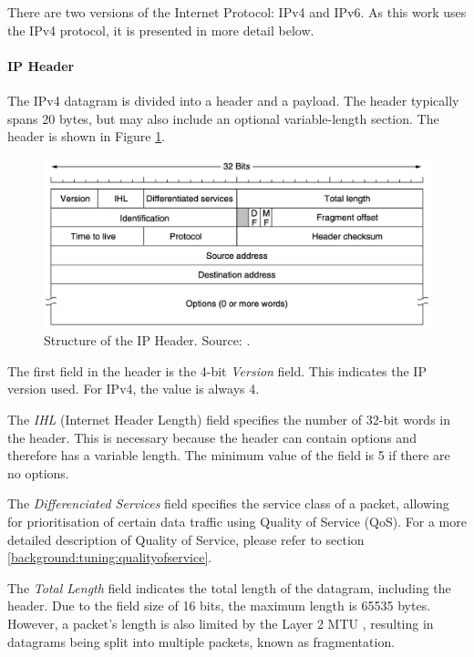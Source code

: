 There are two versions of the Internet Protocol: IPv4 and IPv6. As this work uses the IPv4 protocol, it is presented in more detail below.

\paragraph{IP Header} \label{chap:ipheader}

The IPv4 datagram is divided into a header and a payload. The header typically spans 20 bytes, but may also include an optional variable-length section. The header is shown in Figure \ref{fig:IPHeader}.

\begin{figure}[h]
    \centering
    \includegraphics[width=1\linewidth]{figures/tcpip_refmodel/image7.png}
    \caption[Structure of the IP Header]{Structure of the IP Header. Source: \cite{Tanenbaum2010}.}
    \label{fig:IPHeader}
\end{figure}

The first field in the header is the 4-bit \textit{Version} field. This indicates the IP version used. For IPv4, the value is always 4.

The \textit{IHL} (Internet Header Length) field specifies the number of 32-bit words in the header. This is necessary because the header can contain options and therefore has a variable length. The minimum value of the field is 5 if there are no options.

The \textit{Differenciated Services} field specifies the service class of a packet, allowing for prioritisation of certain data traffic using Quality of Service (QoS). For a more detailed description of Quality of Service, please refer to section \ref{background:tuning:qualityofservice}.

The \textit{Total Length} field indicates the total length of the datagram, including the header. Due to the field size of 16 bits, the maximum length is 65535 bytes. However, a packet's length is also limited by the Layer 2 MTU \cite{Weigel2021}, resulting in datagrams being split into multiple packets, known as fragmentation. 

